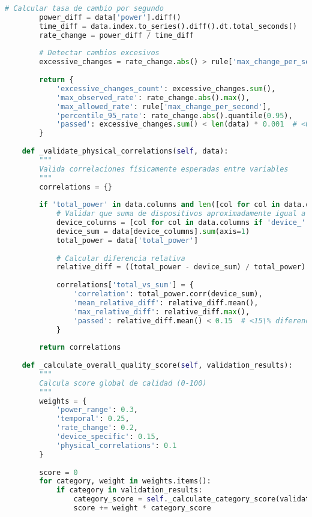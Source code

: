 \begin{lstlisting}[language=Python, caption=Framework de validación de calidad de datos]
        # Calcular tasa de cambio por segundo
        power_diff = data['power'].diff()
        time_diff = data.index.to_series().diff().dt.total_seconds()
        rate_change = power_diff / time_diff
        
        # Detectar cambios excesivos
        excessive_changes = rate_change.abs() > rule['max_change_per_second']
        
        return {
            'excessive_changes_count': excessive_changes.sum(),
            'max_observed_rate': rate_change.abs().max(),
            'max_allowed_rate': rule['max_change_per_second'],
            'percentile_95_rate': rate_change.abs().quantile(0.95),
            'passed': excessive_changes.sum() < len(data) * 0.001  # <0.1\% permitido
        }
    
    def _validate_physical_correlations(self, data):
        """
        Valida correlaciones físicamente esperadas entre variables
        """
        correlations = {}
        
        if 'total_power' in data.columns and len([col for col in data.columns if 'device_' in col]) > 1:
            # Validar que suma de dispositivos aproximadamente igual a total (considerando pérdidas)
            device_columns = [col for col in data.columns if 'device_' in col]
            device_sum = data[device_columns].sum(axis=1)
            total_power = data['total_power']
            
            # Calcular diferencia relativa
            relative_diff = ((total_power - device_sum) / total_power).abs()
            
            correlations['total_vs_sum'] = {
                'correlation': total_power.corr(device_sum),
                'mean_relative_diff': relative_diff.mean(),
                'max_relative_diff': relative_diff.max(),
                'passed': relative_diff.mean() < 0.15  # <15\% diferencia promedio
            }
        
        return correlations
    
    def _calculate_overall_quality_score(self, validation_results):
        """
        Calcula score global de calidad (0-100)
        """
        weights = {
            'power_range': 0.3,
            'temporal': 0.25,
            'rate_change': 0.2,
            'device_specific': 0.15,
            'physical_correlations': 0.1
        }
        
        score = 0
        for category, weight in weights.items():
            if category in validation_results:
                category_score = self._calculate_category_score(validation_results[category])
                score += weight * category_score
        

\end{lstlisting}
